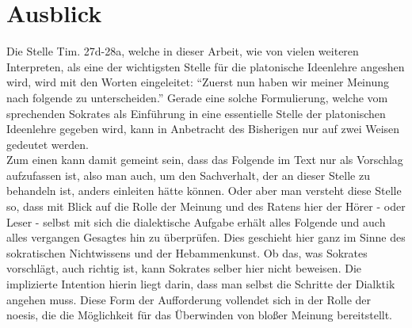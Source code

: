 \documentclass[12pt]{article}
\begin{document}


\section{Ausblick}
Die Stelle Tim. 27d-28a, welche in dieser Arbeit, wie von vielen weiteren Interpreten, als eine der wichtigsten Stelle für die platonische Ideenlehre angeshen wird, wird mit den Worten eingeleitet: \enquote{Zuerst nun haben wir meiner Meinung nach folgende zu unterscheiden.} Gerade eine solche Formulierung, welche vom sprechenden Sokrates als Einführung in eine essentielle Stelle der platonischen Ideenlehre gegeben wird, kann in Anbetracht des Bisherigen nur auf zwei Weisen gedeutet werden.\\
Zum einen kann damit gemeint sein, dass das Folgende im Text nur als Vorschlag aufzufassen ist, also man auch, um den Sachverhalt, der an dieser Stelle zu behandeln ist, anders einleiten hätte können. Oder aber man versteht diese Stelle so, dass mit Blick auf die Rolle der Meinung und des Ratens hier der Hörer - oder Leser - selbst mit sich die dialektische Aufgabe erhält alles Folgende und auch alles vergangen Gesagtes hin zu überprüfen. Dies geschieht hier ganz im Sinne des sokratischen Nichtwissens und der Hebammenkunst. Ob das, was Sokrates vorschlägt, auch richtig ist, kann Sokrates selber hier nicht beweisen. Die implizierte Intention hierin liegt darin, dass man selbst die Schritte der Dialktik angehen muss. Diese Form der Aufforderung vollendet sich in der Rolle der noesis, die die Möglichkeit für das Überwinden von bloßer Meinung bereitstellt. 
\end{document}
